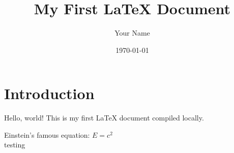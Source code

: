 \documentclass{natsirt}
\title{My First LaTeX Document}
\author{Your Name}
\date{\today}
\begin{document}
\section{Introduction}
Hello, world! This is my first LaTeX document compiled locally.
 
\begin{bluebox}
Einstein's famous equation: $E = c^2$\\
testing 

\end{bluebox}
\end{document}
